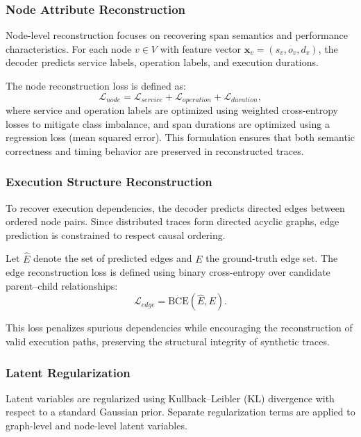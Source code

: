 \documentclass[sigconf,review]{acmart}
\begin{document}
\subsubsection{Node Attribute Reconstruction}

Node-level reconstruction focuses on recovering span semantics and performance characteristics. For each node $v \in V$ with feature vector $\mathbf{x}_v = (s_v, o_v, d_v)$, the decoder predicts service labels, operation labels, and execution durations.

The node reconstruction loss is defined as:
\begin{equation}
\mathcal{L}_{node} =
\mathcal{L}_{service} +
\mathcal{L}_{operation} +
\mathcal{L}_{duration},
\end{equation}
where service and operation labels are optimized using weighted cross-entropy losses to mitigate class imbalance, and span durations are optimized using a regression loss (mean squared error). This formulation ensures that both semantic correctness and timing behavior are preserved in reconstructed traces.

\subsubsection{Execution Structure Reconstruction}

To recover execution dependencies, the decoder predicts directed edges between ordered node pairs. Since distributed traces form directed acyclic graphs, edge prediction is constrained to respect causal ordering.

Let $\hat{E}$ denote the set of predicted edges and $E$ the ground-truth edge set. The edge reconstruction loss is defined using binary cross-entropy over candidate parent--child relationships:
\begin{equation}
\mathcal{L}_{edge} =
\mathrm{BCE}(\hat{E}, E).
\end{equation}

This loss penalizes spurious dependencies while encouraging the reconstruction of valid execution paths, preserving the structural integrity of synthetic traces.


\subsubsection{Latent Regularization}

Latent variables are regularized using Kullback--Leibler (KL) divergence with respect to a standard Gaussian prior. Separate regularization terms are applied to graph-level and node-level latent variables.
\end{document}
